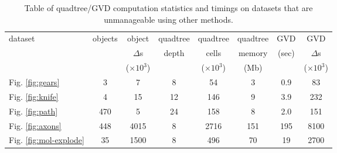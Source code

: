 \documentclass[submission]{gmp2017}
\begin{document}

\begin{table*}
  \centering
  \footnotesize{
  \begin{tabular}{l c c c c c c c}
    \toprule
    dataset & objects & object          & quadtree   & quadtree          & quadtree &
    GVD   & GVD             \\
            &         & $\Delta$s       & depth    & cells           & memory &
    (sec) & $\Delta$s       \\
            &         & ($\times 10^3$) &          & ($\times 10^3$) & (Mb)   &
          & ($\times 10^3$) \\
    \midrule
    Fig. \ref{fig:gears} & 3 & 7 & 8 & 54 & 3 & 0.9 & 83\\
    Fig. \ref{fig:knife} & 4 & 15 & 12 & 146 & 9 & 3.9 & 232 \\
    Fig. \ref{fig:path} & 470 & 5 & 24 & 158 & 8 & 2.0 & 151 \\
    Fig. \ref{fig:axons} & 448 & 4015 & 8 & 2716 & 151 & 195 & 8100 \\
    Fig. \ref{fig:mol-explode} & 35 & 1500 & 8 & 496 & 70 & 19 & 2700 \\
    \bottomrule
  \end{tabular}}
  \caption{Table of quadtree/GVD computation statistics and timings on datasets that are unmanageable using other methods. }
  \label{tab:timings}
\end{table*}
\end{document}
